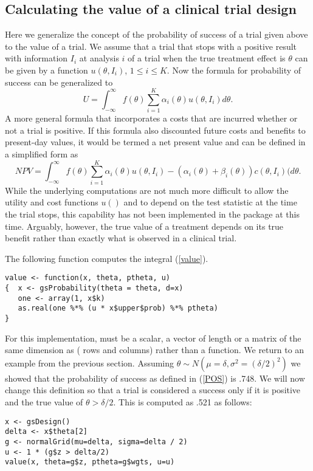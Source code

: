 \subsection{Calculating the value of a clinical trial design}
Here we generalize the concept of the probability of success of a trial given above to the value of a trial.
We assume that a trial that stops with a positive result with information $I_i$ at analysis $i$ of a trial when the true treatment effect is $\theta$ can be given by a function $u(\theta, I_i)$, $1\leq i\leq K$.
Now the formula for probability of success can be generalized to
\begin{equation}
U=\int_{-\infty}^\infty f(\theta) \sum_{i=1}^K \alpha_i(\theta)u(\theta,I_i)d\theta.\label{value}
\end{equation}
A more general formula that incorporates a costs that are incurred whether or not a trial is positive. 
If this formula also discounted future costs and benefits to present-day values, it would be termed a net present value and can be defined in a simplified form as
\begin{equation}
NPV=\int_{-\infty}^\infty f(\theta) \sum_{i=1}^K \alpha_i(\theta)u(\theta,I_i)-(\alpha_i(\theta)+\beta_i(\theta))
c(\theta,I_i)(d\theta.\label{NPV}
\end{equation}
While the underlying computations are not much more difficult to allow the utility and cost functions $u()$  and to depend on the test statistic at the time the trial stops, this capability has not been implemented in the package at this time. 
Arguably, however, the true value of a treatment depends on its true benefit rather than exactly what is observed in a clinical trial.

The following function computes the integral (\ref{value}).
\begin{verbatim}
value <- function(x, theta, ptheta, u)
{  x <- gsProbability(theta = theta, d=x)
   one <- array(1, x$k)
   as.real(one %*% (u * x$upper$prob) %*% ptheta)
}
\end{verbatim}
For this implementation,  must be a scalar, a vector of length  or a matrix of the same dimension as  ( rows and  columns) rather than a function. 
We return to an example from the previous section.
Assuming $\theta\sim N(\mu=\delta, \sigma^2=(\delta/2)^2)$ we showed that the probability of success as defined in (\ref{POS}) is .748.
We will now change this definition so that a trial is considered a success only if it is positive and the true value of $\theta > \delta/2.$
This is computed as .521 as follows:
\begin{verbatim}
x <- gsDesign()
delta <- x$theta[2]
g <- normalGrid(mu=delta, sigma=delta / 2)
u <- 1 * (g$z > delta/2)
value(x, theta=g$z, ptheta=g$wgts, u=u)
\end{verbatim}

